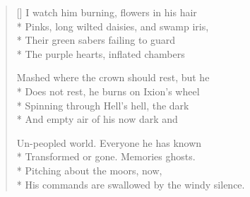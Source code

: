 \label{ch:lear_bg}
\settowidth{\versewidth}{His commands are swallowed by the windy silence.}
\begin{verse}[\versewidth]
I watch him burning, flowers in his hair\\*
Pinks, long wilted daisies, and swamp iris,\\*
Their green sabers failing to guard\\*
The purple hearts, inflated chambers

Mashed where the crown should rest, but he\\*
Does not rest, he burns on Ixion's wheel\\*
Spinning through Hell's hell, the dark\\*
And empty air of his now dark and

Un-peopled world. Everyone he has known\\*
Transformed or gone. Memories ghosts.\\*
Pitching about the moors, now,\\*
His commands are swallowed by the windy silence.
\end{verse}
